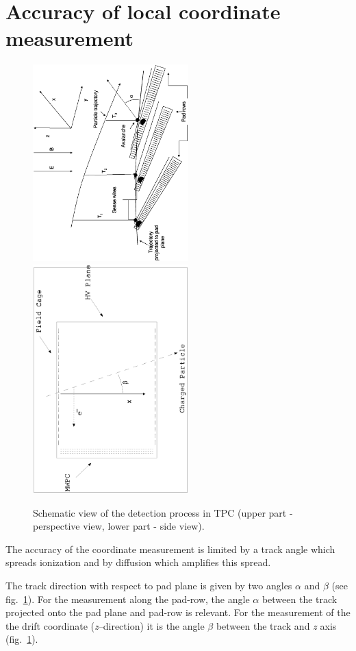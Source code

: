 \documentclass[a4paper,12pt]{article}
\begin{document}
\section{Accuracy of local coordinate measurement}


\begin{figure}[t]
\includegraphics[width=60mm,angle=-90]{picCluster/pic2.eps}
\includegraphics[width=60mm,angle=-90]{picCluster/pic1.eps}
\caption{Schematic view of the detection process in TPC  (upper
part - perspective view, lower part - side view).} \label{figTPC}
\end{figure}

The accuracy of the coordinate measurement is limited by a track
angle which spreads ionization and by diffusion which amplifies
this spread.

The track direction with respect to pad plane is given by two
angles $\alpha$ and $\beta$ (see fig.~\ref{figTPC}). For the
measurement along the pad-row, the angle $\alpha$ between the
track projected onto the pad plane and pad-row is relevant. For
the measurement of the the drift coordinate ({\it{z}}--direction)
it is the angle $\beta$ between the track and {\it{z}} axis
(fig.~\ref{figTPC}).
\end{document}
